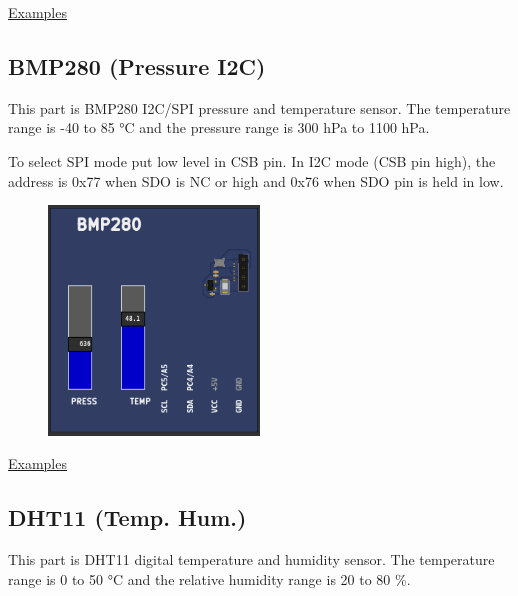 \href{https://lcgamboa.github.io/picsimlab_examples/parts_BMP180_(Pressure_I2C).html}{Examples}

\vspace{0.5cm}

\subsection{BMP280 (Pressure I2C)} 

This part is BMP280 I2C/SPI pressure and temperature sensor. 
The temperature  range is -40 to 85 °C  
and the pressure range is 300 hPa to 1100 hPa.

To select SPI mode put low level in CSB pin.
In I2C mode (CSB pin high), the address is 0x77 when SDO is NC or high and 0x76 when SDO pin is held in low. 

\begin{figure}[H]
\center
\includegraphics[width=0.5\textwidth]{img/part_bmp280.png} 
\end{figure} 


\href{https://lcgamboa.github.io/picsimlab_examples/parts_BMP280_(Pressure_I2C).html}{Examples}

\vspace{0.5cm}

\subsection{DHT11 (Temp. Hum.)} 

This part is DHT11 digital temperature and humidity sensor. The temperature  range is 0 to 50 °C  
and the relative humidity range is 20 to 80 \%.

